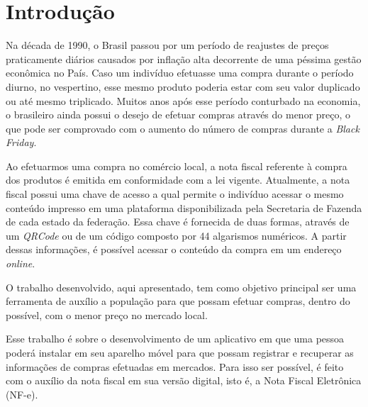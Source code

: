 \chapter{Introdução}


Na década de 1990, o Brasil passou por um período de reajustes de preços praticamente diários causados por inflação alta decorrente de uma péssima gestão econômica no País. Caso um indivíduo efetuasse uma compra durante o período diurno, no vespertino, esse mesmo produto poderia estar com seu valor duplicado ou até mesmo triplicado. Muitos anos após esse período conturbado na economia, o brasileiro ainda possui o desejo de efetuar compras através do menor preço, o que pode ser comprovado com o aumento do número de compras durante a \textit{Black Friday}.

Ao efetuarmos uma compra no comércio local, a nota fiscal referente à compra dos produtos é emitida em conformidade com a lei vigente. Atualmente, a nota fiscal possui uma chave de acesso a qual permite o indivíduo acessar o mesmo conteúdo impresso em uma plataforma disponibilizada pela Secretaria de Fazenda de cada estado da federação. Essa chave é fornecida de duas formas, através de um \textit{QRCode} ou de um código composto por 44 algarismos numéricos. A partir dessas informações, é possível acessar o conteúdo da compra em um endereço \textit{online}.


O trabalho desenvolvido, aqui apresentado, tem como objetivo principal ser uma ferramenta de auxílio a população para que possam efetuar compras, dentro do possível, com o menor preço no mercado local.


Esse trabalho é sobre o desenvolvimento de um aplicativo em que uma pessoa poderá instalar em seu aparelho móvel para que possam registrar e recuperar as informações de compras efetuadas em mercados. Para isso ser possível, é feito com o auxílio da nota fiscal em sua versão digital, isto é, a Nota Fiscal Eletrônica (NF-e).

